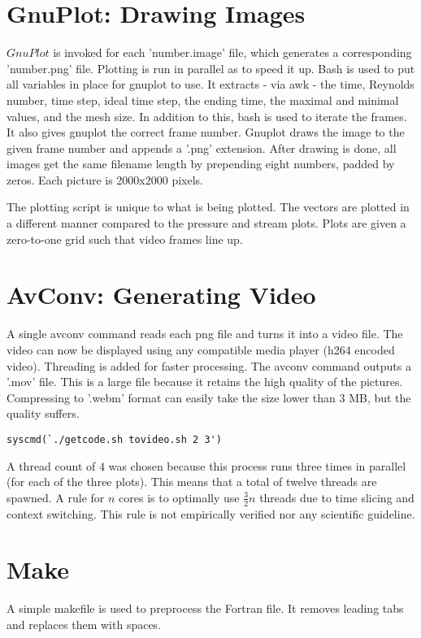 \documentclass[listof=totoc]{report}
\begin{document}
\section{GnuPlot: Drawing Images}
$GnuPlot$ is invoked for each 'number.image' file, which generates a corresponding 'number.png' file. Plotting is run in parallel as to speed it up. Bash is used to put all variables in place for gnuplot to use. It extracts - via awk - the time, Reynolds number, time step, ideal time step, the ending time, the maximal and minimal values, and the mesh size. In addition to this, bash is used to iterate the frames. It also gives gnuplot the correct frame number. Gnuplot draws the image to the given frame number and appends a '.png' extension. After drawing is done, all images get the same filename length by prepending eight numbers, padded by zeros. Each picture is 2000x2000 pixels.

The plotting script is unique to what is being plotted. The vectors are plotted in a different manner compared to the pressure and stream plots. Plots are given a zero-to-one grid such that video frames line up.

\section{AvConv: Generating Video}
A single avconv command reads each png file and turns it into a video file. The video can now be displayed using any compatible media player (h264 encoded video). Threading is added for faster processing. The avconv command outputs a '.mov' file. This is a large file because it retains the high quality of the pictures. Compressing to '.webm' format can easily take the size lower than 3 MB, but the quality suffers.

\begin{verbatim}
syscmd(`./getcode.sh tovideo.sh 2 3')
\end{verbatim}

A thread count of $4$ was chosen because this process runs three times in parallel (for each of the three plots). This means that a total of twelve threads are spawned. A rule for $n$ cores is to optimally use $\frac{3}{2} n$ threads due to time slicing and context switching. This rule is not empirically verified nor any scientific guideline.

\section{Make}
A simple makefile is used to preprocess the Fortran file. It removes leading tabs and replaces them with spaces.
\end{document}
